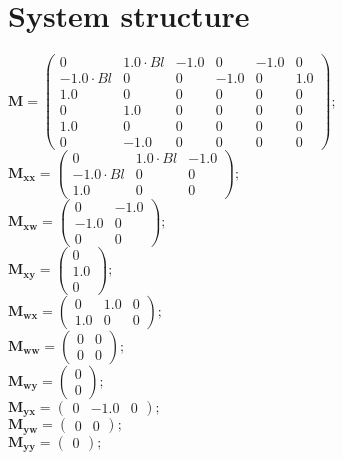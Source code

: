 \documentclass[11pt, oneside]{article}      %
\begin{document}
\section{System structure}
%

%
$ \mathbf{M} = \left(\begin{array}{cccccc}0 & 1.0 \cdot Bl & -1.0 & 0 & -1.0 & 0\\- 1.0 \cdot Bl & 0 & 0 & -1.0 & 0 & 1.0\\1.0 & 0 & 0 & 0 & 0 & 0\\0 & 1.0 & 0 & 0 & 0 & 0\\1.0 & 0 & 0 & 0 & 0 & 0\\0 & -1.0 & 0 & 0 & 0 & 0\end{array}\right) ; $ 
%
\\
%
$ \mathbf{M_{xx}} = \left(\begin{array}{ccc}0 & 1.0 \cdot Bl & -1.0\\- 1.0 \cdot Bl & 0 & 0\\1.0 & 0 & 0\end{array}\right) ; $ 
%
\\
%
$ \mathbf{M_{xw}} = \left(\begin{array}{cc}0 & -1.0\\-1.0 & 0\\0 & 0\end{array}\right) ; $ 
%
\\
%
$ \mathbf{M_{xy}} = \left(\begin{array}{c}0\\1.0\\0\end{array}\right) ; $ 
%
\\
%
$ \mathbf{M_{wx}} = \left(\begin{array}{ccc}0 & 1.0 & 0\\1.0 & 0 & 0\end{array}\right) ; $ 
%
\\
%
$ \mathbf{M_{ww}} = \left(\begin{array}{cc}0 & 0\\0 & 0\end{array}\right) ; $ 
%
\\
%
$ \mathbf{M_{wy}} = \left(\begin{array}{c}0\\0\end{array}\right) ; $ 
%
\\
%
$ \mathbf{M_{yx}} = \left(\begin{array}{ccc}0 & -1.0 & 0\end{array}\right) ; $ 
%
\\
%
$ \mathbf{M_{yw}} = \left(\begin{array}{cc}0 & 0\end{array}\right) ; $ 
%
\\
%
$ \mathbf{M_{yy}} = \left(\begin{array}{c}0\end{array}\right) ; $ 
%
\\
%
\end{document}
